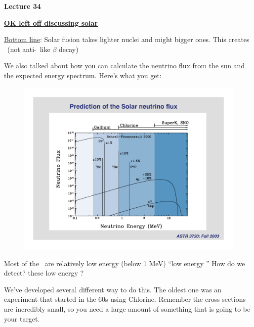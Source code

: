 \usepackage{fancyhdr}

\fancyhf{}


\thispagestyle{fancy}

\begin{center}
{\huge \textbf{Lecture 34}}
\end{center}

{\fontsize{14}{16}\selectfont

\textbf{\underline{OK left off discussing solar \nus}} 

\underline{Bottom line}: Solar fusion takes lighter nuclei and might bigger ones.  
This creates \nus\ (not anti-\nus\ like $\beta$ decay)

We also talked about how you can calculate the neutrino flux from the sun and the expected energy spectrum.
Here's what you get:

\begin{figure}[h!]
\centering
\includegraphics[width=1.0\textwidth]{./NuFromSun.pdf}
\end{figure}

Most of the \nus\ are relatively low energy (below 1 MeV) ``low energy \nus''
How do we detect? these low energy \nus ?

We've developed several different way to do this. 
The oldest one was an experiment that started in the 60s using Chlorine. 
Remember the cross sections are incredibly small, so you need a large amount of something that is going to be your target. 

}
